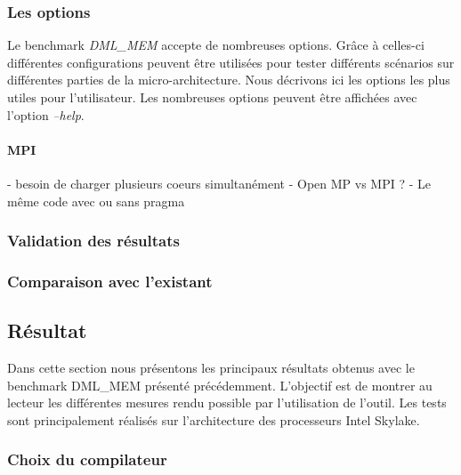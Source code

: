   

    \subsubsection{Les options}
        Le benchmark \textit{DML\_MEM} accepte de nombreuses options. Grâce à celles-ci différentes configurations peuvent être utilisées pour tester différents scénarios sur différentes parties de la micro-architecture. Nous décrivons ici les options les plus utiles pour l'utilisateur. Les nombreuses options peuvent être affichées avec l'option \textit{--help}.
        

       \paragraph{MPI}
            - besoin de charger plusieurs coeurs simultanément
                - Open MP vs MPI ?
            - Le même code avec ou sans pragma
   
    
    \subsubsection{Validation des résultats}


    \subsubsection{Comparaison avec l'existant}


\subsection{Résultat}

    Dans cette section nous présentons les principaux résultats obtenus avec le benchmark DML\_MEM présenté précédemment. L'objectif est de montrer au lecteur les différentes mesures rendu possible par l'utilisation de l'outil. Les tests sont principalement réalisés sur l'architecture des processeurs Intel Skylake. 


    \subsubsection{Choix du compilateur}
    
